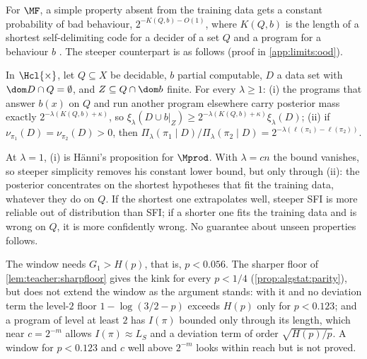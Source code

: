 For $\MF$, a simple property absent from the training data gets a constant probability of bad behaviour, $2^{-K(Q,b)-O(1)}$, where $K(Q,b)$ is the length of a shortest self-delimiting code for a decider of a set $Q$ and a program for a behaviour $b$ \citep[H\"anni's proposition, with no log term]{claudeSFI2026fundamentals}. The steeper counterpart is as follows (proof in \cref{app:limits:ood}).

\begin{proposition}\label{prop:limits:ood}
In $\Hcl{\times}$, let $Q\subseteq X$ be decidable, $b$ partial computable, $D$ a data set with $\dom D\cap Q=\emptyset$, and $Z\subseteq Q\cap\dom b$ finite. For every $\lambda\ge1$: (i) the programs that answer $b(x)$ on $Q$ and run another program elsewhere carry posterior mass exactly $2^{-\lambda(K(Q,b)+\kappa)}$, so $\xi_\lambda(D\cup b|_Z)\ge2^{-\lambda(K(Q,b)+\kappa)}\xi_\lambda(D)$; (ii) if $\nu_{\pi_1}(D)=\nu_{\pi_2}(D)>0$, then $\Pi_\lambda(\pi_1\mid D)/\Pi_\lambda(\pi_2\mid D)=2^{-\lambda(\ell(\pi_1)-\ell(\pi_2))}$.
\end{proposition}

At $\lambda=1$, (i) is H\"anni's proposition for $\Mprod$. With $\lambda=cn$ the bound vanishes, so steeper simplicity removes his constant lower bound, but only through (ii): the posterior concentrates on the shortest hypotheses that fit the training data, whatever they do on $Q$. If the shortest one extrapolates well, steeper SFI is more reliable out of distribution than SFI; if a shorter one fits the training data and is wrong on $Q$, it is more confidently wrong. No guarantee about unseen properties follows.

\begin{remark}\label{rem:limits:method}
The window needs $G_1>H(p)$, that is, $p<0.056$. The sharper floor of \cref{lem:teacher:sharpfloor} gives the kink for every $p<1/4$ (\cref{prop:algstat:parity}), but does not extend the window as the argument stands: with it and no deviation term the level-$2$ floor $1-\log(3/2-p)$ exceeds $H(p)$ only for $p<0.123$; and a program of level at least $2$ has $I(\pi)$ bounded only through its length, which near $c=2^{-m}$ allows $I(\pi)\approx L_S$ and a deviation term of order $\sqrt{H(p)/p}$. A window for $p<0.123$ and $c$ well above $2^{-m}$ looks within reach but is not proved.
\end{remark}

